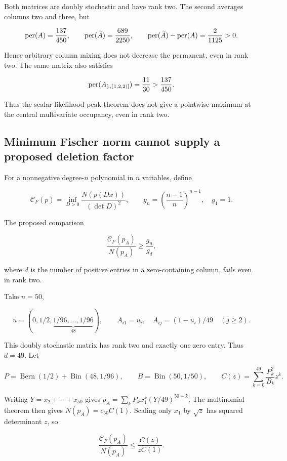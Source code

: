 Both matrices are doubly stochastic and have rank two. The second averages columns two and three, but

\[
\operatorname{per}(A)=\frac{137}{450},\qquad
\operatorname{per}(\widetilde A)=\frac{689}{2250},\qquad
\operatorname{per}(\widetilde A)-\operatorname{per}(A)=\frac2{1125}>0.
\]

Hence arbitrary column mixing does not decrease the permanent, even in rank two. The same matrix also satisfies

\[
\operatorname{per}(A_{[:,(1,2,2)]})=\frac{11}{30}>\frac{137}{450}.
\]

Thus the scalar likelihood-peak theorem does not give a pointwise maximum at the central multivariate occupancy, even in rank two.

\subsection{Minimum Fischer norm cannot supply a proposed deletion factor}\label{app:additional-19}

For a nonnegative degree-\(n\) polynomial in \(n\) variables, define

\[
\mathcal C_F(p)=\inf_{D>0}\frac{N(p(Dx))}{(\det D)^2},\qquad
g_n=\left(\frac{n-1}{n}\right)^{n-1},\quad g_1=1.
\]

The proposed comparison

\begin{equation}
\frac{\mathcal C_F(p_A)}{N(p_A)}\ge\frac{g_n}{g_d},
\label{eq:additional-5}
\end{equation}

where \(d\) is the number of positive entries in a zero-containing column, fails even in rank two.

Take \(n=50\),

\[
u=(0,1/2,\underbrace{1/96,\ldots,1/96}_{48}),\qquad
A_{i1}=u_i,\quad A_{ij}=(1-u_i)/49\quad(j\ge2).
\]

This doubly stochastic matrix has rank two and exactly one zero entry. Thus \(d=49\). Let

\[
P=\operatorname{Bern}(1/2)+\operatorname{Bin}(48,1/96),\qquad
B=\operatorname{Bin}(50,1/50),\qquad
C(z)=\sum_{k=0}^{49}\frac{P_k^2}{B_k}z^k.
\]

Writing \(Y=x_2+\cdots+x_{50}\) gives \(p_A=\sum_kP_kx_1^k(Y/49)^{50-k}\). The multinomial theorem then gives \(N(p_A)=c_{50}C(1)\). Scaling only \(x_1\) by \(\sqrt z\) has squared determinant \(z\), so

\[
\frac{\mathcal C_F(p_A)}{N(p_A)}\le\frac{C(z)}{zC(1)}.
\]

